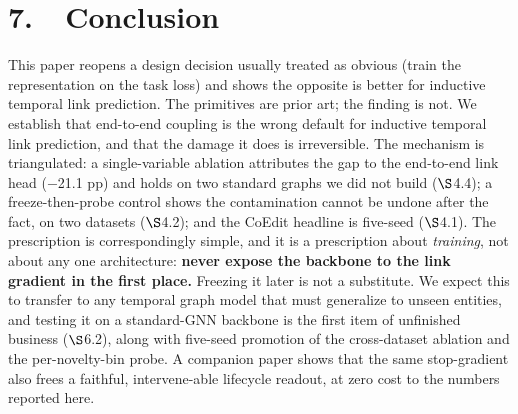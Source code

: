 \documentclass[conference]{IEEEtran}
\begin{document}
\section*{7.~~Conclusion}

This paper reopens a design decision usually treated as obvious (train the representation on the task loss) and shows the opposite is better for inductive temporal link prediction. The primitives are prior art; the finding is not. We establish that end-to-end coupling is the wrong default for inductive temporal link prediction, and that the damage it does is irreversible. The mechanism is triangulated: a single-variable ablation attributes the gap to the end-to-end link head ($-$21.1 pp) and holds on two standard graphs we did not build ($\S$4.4); a freeze-then-probe control shows the contamination cannot be undone after the fact, on two datasets ($\S$4.2); and the CoEdit headline is five-seed ($\S$4.1). The prescription is correspondingly simple, and it is a prescription about \emph{training}, not about any one architecture: \textbf{never expose the backbone to the link gradient in the first place.} Freezing it later is not a substitute. We expect this to transfer to any temporal graph model that must generalize to unseen entities, and testing it on a standard-GNN backbone is the first item of unfinished business ($\S$6.2), along with five-seed promotion of the cross-dataset ablation and the per-novelty-bin probe. A companion paper shows that the same stop-gradient also frees a faithful, intervene-able lifecycle readout, at zero cost to the numbers reported here.
\end{document}
